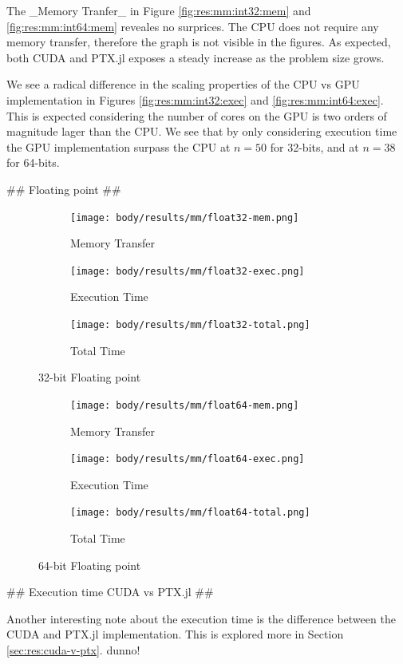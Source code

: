 \begin{markdown}
The _Memory Tranfer_ in Figure \ref{fig:res:mm:int32:mem} and
\ref{fig:res:mm:int64:mem} reveales no surprices. The CPU does not
require any memory transfer, therefore the graph is not visible in the
figures. As expected, both CUDA and PTX.jl exposes a steady increase
as the problem size grows.

We see a radical difference in the scaling properties of the CPU vs
GPU implementation in Figures \ref{fig:res:mm:int32:exec} and
\ref{fig:res:mm:int64:exec}. This is expected considering the number
of cores on the GPU is two orders of magnitude lager than the CPU. We
see that by only considering execution time the GPU implementation
surpass the CPU at $n=50$ for 32-bits, and at $n=38$ for 64-bits.

## Floating point ##

\begin{figure}[H]
  \centering
  \begin{subfigure}{.33\textwidth}
    \centering
    \texttt{[image: body/results/mm/float32-mem.png]}
    \caption{Memory Transfer}
    \label{fig:res:mm:float32:mem}
  \end{subfigure}%
  \begin{subfigure}{.33\textwidth}
    \centering
    \texttt{[image: body/results/mm/float32-exec.png]}
    \caption{Execution Time}
    \label{fig:res:mm:float32:exec}
  \end{subfigure}%
  \begin{subfigure}{.33\textwidth}
    \centering
    \texttt{[image: body/results/mm/float32-total.png]}
    \caption{Total Time}
    \label{fig:res:mm:float32:tot}
  \end{subfigure}
  \caption{32-bit Floating point}
  \label{fig:res:mm:float32}
\end{figure}


\begin{figure}[H]
  \centering
  \begin{subfigure}{.33\textwidth}
    \centering
    \texttt{[image: body/results/mm/float64-mem.png]}
    \caption{Memory Transfer}
    \label{fig:res:mm:float64:mem}
  \end{subfigure}%
  \begin{subfigure}{.33\textwidth}
    \centering
    \texttt{[image: body/results/mm/float64-exec.png]}
    \caption{Execution Time}
    \label{fig:res:mm:float64:exec}
  \end{subfigure}%
  \begin{subfigure}{.33\textwidth}
    \centering
    \texttt{[image: body/results/mm/float64-total.png]}
    \caption{Total Time}
    \label{fig:res:mm:float64:tot}
  \end{subfigure}
  \caption{64-bit Floating point}
  \label{fig:res:mm:float64}
\end{figure}

## Execution time CUDA vs PTX.jl ##


Another interesting note about the execution time is the difference
between the CUDA and PTX.jl implementation. This is explored more in
Section \ref{sec:res:cuda-v-ptx}.
dunno!

\end{markdown}
